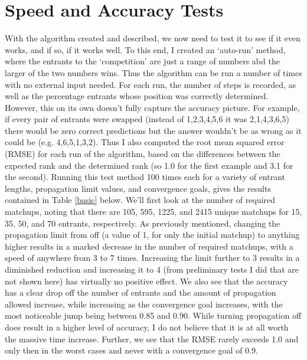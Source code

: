 \documentclass[11pt]{article}
\begin{document}
\section{Speed and Accuracy Tests}
\noindent With the algorithm created and described, we now need to test it to see if it even works, and if so, if it works well. To this end, I created an `auto-run' method, where the entrants to the `competition' are just a range of numbers abd the larger of the two numbers wins. Thus the algorithm can be run a number of times with no external input needed. For each run, the number of steps is recorded, as well as the percentage entrants whose position was correctly determined. However, this on its own doesn't fully capture the accuracy picture. For example, if every pair of entrants were swapped (instead of 1,2,3,4,5,6 it was 2,1,4,3,6,5) there would be zero correct predictions but the answer wouldn't be as wrong as it could be (e.g. 4,6,5,1,3,2). Thus I also computed the root mean squared error (RMSE) for each run of the algorithm, based on the differences between the expected rank and the determined rank (so 1.0 for the first example and 3.1 for the second). Running this test method 100 times each for a variety of entrant lengths, propagation limit values, and convergence goals, gives the results contained in Table \ref{basic} below. We'll first look at the number of required matchups, noting that there are 105, 595, 1225, and 2415 unique matchups for 15, 35, 50, and 70 entrants, respectively. As previously mentioned, changing the propagation limit from off (a value of 1, for only the initial matchup) to anything higher results in a marked decrease in the number of required matchups, with a speed of anywhere from 3 to 7 times. Increasing the limit further to 3 results in a diminished reduction and increasing it to 4 (from preliminary tests I did that are not shown here) has virtually no positive effect. We also see that the accuracy has a clear drop off the number of entrants and the amount of propagation allowed increase, while increasing as the convergence goal increases, with the most noticeable jump being between 0.85 and 0.90. While turning propagation off does result in a higher level of accuracy, I do not believe that it is at all worth the massive time increase. Further, we see that the RMSE rarely exceeds 1.0 and only then in the worst cases and never with a convergence goal of 0.9.
\end{document}

